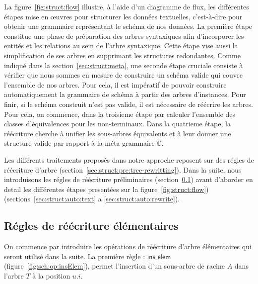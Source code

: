 La figure~\ref{fig:struct:flow} illustre, à l'aide d'un diagramme de flux, les différentes étapes mise en œuvres pour structurer les données textuelles, c'est-à-dire pour obtenir une grammaire représentant le schéma de nos données.
La première étape constitue une phase de préparation des arbres syntaxiques afin d'incorporer les entités et les relations au sein de l'arbre syntaxique.
Cette étape vise aussi la simplification de ses arbres en supprimant les structures redondantes.
Comme indiqué dans la section~\ref{sec:struct:meta}, une seconde étape cruciale consiste à vérifier que nous sommes en mesure de construire un schéma valide qui couvre l'ensemble de nos arbres.
Pour cela, il est impératif de pouvoir construire automatiquement la grammaire de schéma à partir des arbres d'instances.
Pour finir, si le schéma construit n'est pas valide, il est nécessaire de réécrire les arbres.
Pour cela, on commence, dans la troisieme étape par calculer l'ensemble des classes d'équivalences pour les non-terminaux.
Dans la quatrieme étape, la réécriture cherche à unifier les sous-arbres équivalents et à leur donner une structure valide par rapport à la méta-grammaire $\mathbb{G}$.

Les différents traitements proposés dans notre approche reposent sur des régles de réécriture d'arbre (section~\ref{sec:struct:pre:tree-rewritting}).
Dans la suite, nous introduisons les régles de réécriture préliminaires (section~\ref{sec:struct:auto:pre}) avant d'aborder en detail les différentes étapes presentées sur la figure~\ref{fig:struct:flow}) (sections~\ref{sec:struct:auto:text} a \ref{sec:struct:auto:rewrite}).

\subsection{Régles de réécriture élémentaires}
\label{sec:struct:auto:pre}
On commence par introduire les opérations de réécriture d'arbre élémentaires qui seront utilisé dans la suite.
La première règle : $\textsf{ins\_elem}$ (figure~\ref{fig:sch:op:insElem}), permet l'insertion d'un sous-arbre de racine $A$ dans l'arbre $T$ à la position $u.i$.

